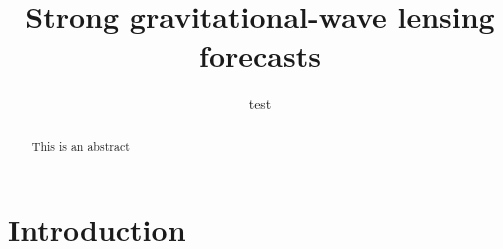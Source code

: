 \documentclass[linenumbers]{aastex631}
\begin{document}
\title{Strong gravitational-wave lensing forecasts}


\author[0000-0002-0786-7307]{test}


\begin{abstract}
This is an abstract
\end{abstract}



\section{Introduction} \label{sec:intro}




\end{document}

